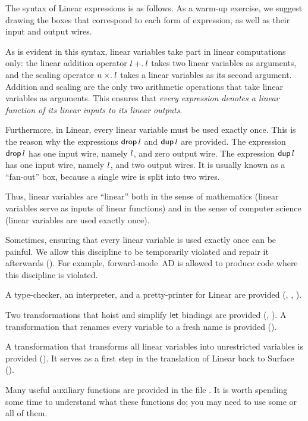\documentclass{article}
\begin{document}
The syntax of Linear expressions is as follows. As a warm-up exercise, we
suggest drawing the boxes that correspond to each form of expression, as
well as their input and output wires.
%


As is evident in this syntax, linear variables take part in linear
computations only: the linear addition operator $l\mathbin{+.}l$ takes two linear
variables as arguments, and the scaling operator $u\mathbin{\times.}l$ takes a linear
variables as its second argument. Addition and scaling are the only two
arithmetic operations that take linear variables as arguments. This ensures
that \emph{every expression denotes a linear function of its linear inputs to
  its linear outputs}.

Furthermore, in Linear, every linear variable must be used exactly once. This
is the reason why the expressions $\mathsf{drop}\,l$ and $\mathsf{dup}\,l$ are provided. The
expression $\mathsf{drop}\,l$ has one input wire, namely $l$, and zero output wire.
The expression $\mathsf{dup}\,l$ has one input wire, namely $l$, and two output
wires. It is usually known as a ``fan-out'' box, because a single wire is
split into two wires.

Thus, linear variables are ``linear'' both in the sense of mathematics
(linear variables serve as inputs of linear functions)
and in the sense of computer science
(linear variables are used exactly once).

Sometimes, ensuring that every linear variable is used exactly once can be
painful. We allow this discipline to be temporarily violated and repair it
afterwards (). For example, forward-mode~AD is allowed
to produce code where this discipline is violated.

A type-checker, an interpreter, and a pretty-printer for Linear are provided
(, , ).

Two transformations that hoist and simplify $\mathsf{let}$ bindings are
provided (, ). A transformation that renames
every variable to a fresh name is provided ().

A transformation that transforms all linear variables into unrestricted
variables is provided (). It serves as a first step in the
translation of Linear back to Surface ().

Many useful auxiliary functions are provided in the file .
It is worth spending some time to understand what these functions do; you
may need to use some or all of them.
\end{document}
